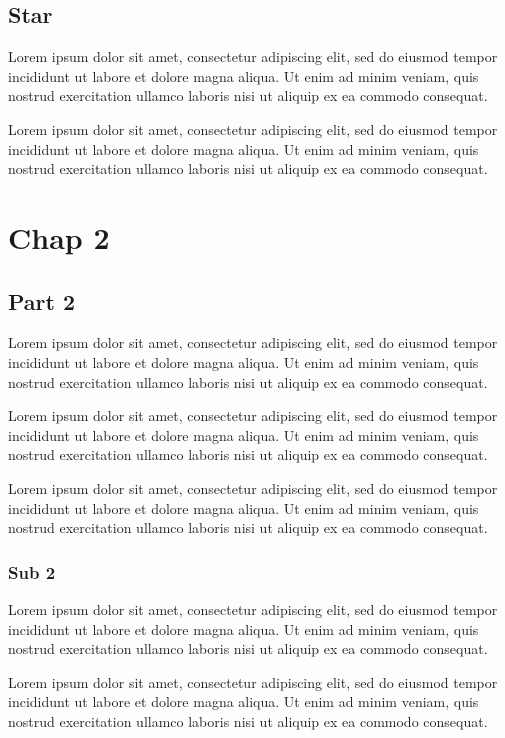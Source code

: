 \documentclass[twoside]{report}
\begin{document}
\section*{Star}
Lorem ipsum dolor sit amet, consectetur adipiscing elit, sed do eiusmod tempor incididunt ut labore et dolore magna aliqua. Ut enim ad minim veniam, quis nostrud exercitation ullamco laboris nisi ut aliquip ex ea commodo consequat.

Lorem ipsum dolor sit amet, consectetur adipiscing elit, sed do eiusmod tempor incididunt ut labore et dolore magna aliqua. Ut enim ad minim veniam, quis nostrud exercitation ullamco laboris nisi ut aliquip ex ea commodo consequat.

\chapter{Chap 2}
\section{Part 2}
Lorem ipsum dolor sit amet, consectetur adipiscing elit, sed do eiusmod tempor incididunt ut labore et dolore magna aliqua. Ut enim ad minim veniam, quis nostrud exercitation ullamco laboris nisi ut aliquip ex ea commodo consequat.

Lorem ipsum dolor sit amet, consectetur adipiscing elit, sed do eiusmod tempor incididunt ut labore et dolore magna aliqua. Ut enim ad minim veniam, quis nostrud exercitation ullamco laboris nisi ut aliquip ex ea commodo consequat.

Lorem ipsum dolor sit amet, consectetur adipiscing elit, sed do eiusmod tempor incididunt ut labore et dolore magna aliqua. Ut enim ad minim veniam, quis nostrud exercitation ullamco laboris nisi ut aliquip ex ea commodo consequat.

\subsection{Sub 2}
Lorem ipsum dolor sit amet, consectetur adipiscing elit, sed do eiusmod tempor incididunt ut labore et dolore magna aliqua. Ut enim ad minim veniam, quis nostrud exercitation ullamco laboris nisi ut aliquip ex ea commodo consequat.

Lorem ipsum dolor sit amet, consectetur adipiscing elit, sed do eiusmod tempor incididunt ut labore et dolore magna aliqua. Ut enim ad minim veniam, quis nostrud exercitation ullamco laboris nisi ut aliquip ex ea commodo consequat.
\end{document}
